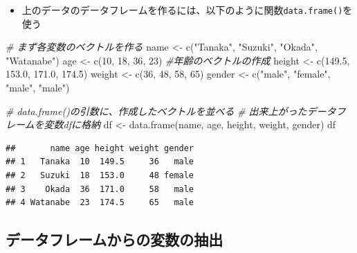 \documentclass[
]{book}
\newenvironment{Shaded}{\begin{snugshade}}{\end{snugshade}}
\newcommand{\CommentTok}[1]{\textcolor[rgb]{0.56,0.35,0.01}{\textit{#1}}}
\newcommand{\DecValTok}[1]{\textcolor[rgb]{0.00,0.00,0.81}{#1}}
\newcommand{\FloatTok}[1]{\textcolor[rgb]{0.00,0.00,0.81}{#1}}
\newcommand{\FunctionTok}[1]{\textcolor[rgb]{0.00,0.00,0.00}{#1}}
\newcommand{\NormalTok}[1]{#1}
\newcommand{\OtherTok}[1]{\textcolor[rgb]{0.56,0.35,0.01}{#1}}
\newcommand{\StringTok}[1]{\textcolor[rgb]{0.31,0.60,0.02}{#1}}
\providecommand{\tightlist}{%
  \setlength{\itemsep}{0pt}\setlength{\parskip}{0pt}}
\begin{document}
\begin{itemize}
\tightlist
\item
  上のデータのデータフレームを作るには、以下のように関数\texttt{data.frame()}を使う
\end{itemize}

\begin{Shaded}
\begin{Highlighting}[]
\CommentTok{\# まず各変数のベクトルを作る}
\NormalTok{name }\OtherTok{\textless{}{-}} \FunctionTok{c}\NormalTok{(}\StringTok{"Tanaka"}\NormalTok{, }\StringTok{"Suzuki"}\NormalTok{, }\StringTok{"Okada"}\NormalTok{, }\StringTok{"Watanabe"}\NormalTok{)}
\NormalTok{age }\OtherTok{\textless{}{-}} \FunctionTok{c}\NormalTok{(}\DecValTok{10}\NormalTok{, }\DecValTok{18}\NormalTok{, }\DecValTok{36}\NormalTok{, }\DecValTok{23}\NormalTok{) }\CommentTok{\#年齢のベクトルの作成}
\NormalTok{height }\OtherTok{\textless{}{-}} \FunctionTok{c}\NormalTok{(}\FloatTok{149.5}\NormalTok{, }\FloatTok{153.0}\NormalTok{, }\FloatTok{171.0}\NormalTok{, }\FloatTok{174.5}\NormalTok{)}
\NormalTok{weight }\OtherTok{\textless{}{-}} \FunctionTok{c}\NormalTok{(}\DecValTok{36}\NormalTok{, }\DecValTok{48}\NormalTok{, }\DecValTok{58}\NormalTok{, }\DecValTok{65}\NormalTok{)}
\NormalTok{gender }\OtherTok{\textless{}{-}} \FunctionTok{c}\NormalTok{(}\StringTok{"male"}\NormalTok{, }\StringTok{"female"}\NormalTok{, }\StringTok{"male"}\NormalTok{, }\StringTok{"male"}\NormalTok{) }

\CommentTok{\# data.frame()の引数に、作成したベクトルを並べる}
\CommentTok{\# 出来上がったデータフレームを変数dfに格納}
\NormalTok{df }\OtherTok{\textless{}{-}} \FunctionTok{data.frame}\NormalTok{(name, age, height, weight, gender)}
\NormalTok{df}
\end{Highlighting}
\end{Shaded}

\begin{verbatim}
##       name age height weight gender
## 1   Tanaka  10  149.5     36   male
## 2   Suzuki  18  153.0     48 female
## 3    Okada  36  171.0     58   male
## 4 Watanabe  23  174.5     65   male
\end{verbatim}

\hypertarget{ux30c7ux30fcux30bfux30d5ux30ecux30fcux30e0ux304bux3089ux306eux5909ux6570ux306eux62bdux51fa}{%
\subsection{データフレームからの変数の抽出}\label{ux30c7ux30fcux30bfux30d5ux30ecux30fcux30e0ux304bux3089ux306eux5909ux6570ux306eux62bdux51fa}}
\end{document}
